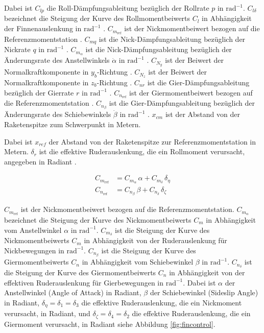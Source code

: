 Dabei ist $C_{lp}$ die Roll-Dämpfungsableitung bezüglich der Rollrate $p$ in $\mathrm{rad^{-1}}$. 
$C_{l\delta}$ bezeichnet die Steigung der Kurve des Rollmomentbeiwerts $C_l$ in Abhängigkeit der Finnenauslenkung in $\mathrm{rad^{-1}}$ . 
$C_{m_{\mathrm{ref}}}$ ist der Nickmomentbeiwert bezogen auf die Referenzmomentstation . 
$C_{mq}$ ist die Nick-Dämpfungsableitung bezüglich der Nickrate $q$ in $\mathrm{rad^{-1}}$ . 
$C_{m_\alpha}$ ist die Nick-Dämpfungsableitung bezüglich der Änderungsrate des Anstellwinkels $\dot{\alpha}$ in $\mathrm{rad^{-1}}$ . 
$C_{N_y}$ ist der Beiwert der Normalkraftkomponente in $y_b$-Richtung . 
$C_{N_z}$ ist der Beiwert der Normalkraftkomponente in $z_b$-Richtung . 
$C_{nr}$ ist die Gier-Dämpfungsableitung bezüglich der Gierrate $r$ in $\mathrm{rad^{-1}}$ . 
$C_{n_{\mathrm{ref}}}$ ist der Giermomentbeiwert bezogen auf die Referenzmomentstation . 
$C_{n_\beta}$ ist die Gier-Dämpfungsableitung bezüglich der Änderungsrate des Schiebewinkels $\dot{\beta}$ in $\mathrm{rad^{-1}}$ . 
$x_{cm}$ ist der Abstand von der Raketenspitze zum Schwerpunkt in Metern.

Dabei ist $x_{ref}$ der Abstand von der Raketenspitze zur Referenzmomentstation in Metern. 
$\delta_r$ ist die effektive Ruderauslenkung, die ein Rollmoment verursacht, angegeben in Radiant .

\begin{align}
C_{m_{\mathrm{ref}}} &= C_{m_\alpha}\,\alpha 
                       + C_{m_\delta}\,\delta_\eta \\[6pt]
C_{n_{\mathrm{ref}}} &= C_{n_\beta}\,\beta 
                       + C_{n_\delta}\,\delta_\zeta
\end{align}

$C_{m_{\mathrm{ref}}}$ ist der Nickmomentbeiwert bezogen auf die Referenzmomentstation. 
$C_{m_\alpha}$ bezeichnet die Steigung der Kurve des Nickmomentbeiwerts $C_m$ in Abhängigkeit vom Anstellwinkel $\alpha$ in $\mathrm{rad^{-1}}$. 
$C_{m_\delta}$ ist die Steigung der Kurve des Nickmomentbeiwerts $C_m$ in Abhängigkeit von der Ruderauslenkung für Nickbewegungen in $\mathrm{rad^{-1}}$. 
$C_{n_\beta}$ ist die Steigung der Kurve des Giermomentbeiwerts $C_n$ in Abhängigkeit vom Schiebewinkel $\beta$ in $\mathrm{rad^{-1}}$. 
$C_{n_\delta}$ ist die Steigung der Kurve des Giermomentbeiwerts $C_n$ in Abhängigkeit von der effektiven Ruderauslenkung für Gierbewegungen in $\mathrm{rad^{-1}}$.
Dabei ist $\alpha$ der Anstellwinkel (Angle of Attack) in Radiant, 
$\beta$ der Schiebewinkel (Sideslip Angle) in Radiant, 
$\delta_\eta = \delta_1 = \delta_3$ die effektive Ruderauslenkung, die ein Nickmoment verursacht, in Radiant, 
und $\delta_\zeta = \delta_4 = \delta_2$ die effektive Ruderauslenkung, die ein Giermoment verursacht, in Radiant siehe Abbildung \ref{fig:fincontrol}.


